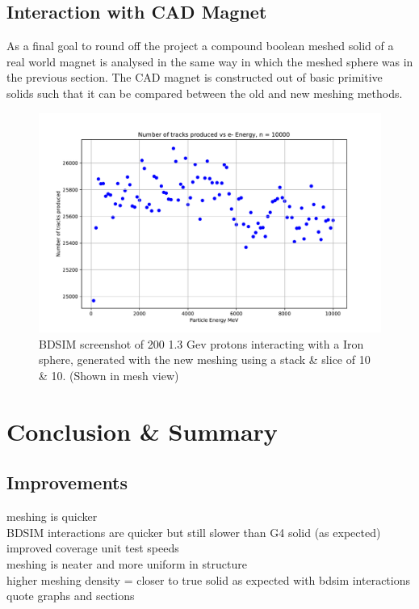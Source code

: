 \documentclass[12pt,a4paper]{article}
\begin{document}
\subsection{Interaction with CAD Magnet}
As a final goal to round off the project a compound boolean meshed solid of a real world magnet is analysed in the same way in which the meshed sphere was in the previous section. The CAD magnet is constructed out of basic primitive solids such that it can be compared between the old and new meshing methods.

\begin{figure}[h!]
\centering
\includegraphics[scale=0.7]{Images//CAD_Mag//Secondaries_count.pdf}
\caption[width=\columnwidth]{BDSIM screenshot of 200 1.3 Gev protons interacting with a Iron sphere, generated with the new meshing using a stack \& slice of 10 \& 10. (Shown in mesh view)}
\label{sphbd}
\end{figure}

\newpage
\section{Conclusion \& Summary}
\label{conc}

\subsection{Improvements}
meshing is quicker\\
BDSIM interactions are quicker but still slower than G4 solid (as expected)
improved coverage unit test speeds\\
meshing is neater and more uniform in structure\\
higher meshing density = closer to true solid as expected with bdsim interactions\\
quote graphs and sections\\
\end{document}
